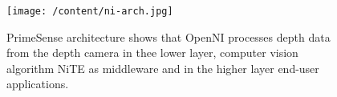 \begin{figure}
	[h] \centering 
	\texttt{[image: /content/ni-arch.jpg]} \caption{ PrimeSense architecture shows that OpenNI processes depth data from the depth camera in thee lower layer, computer vision algorithm NiTE as middleware and in the higher layer end-user applications. \cite{12} } \label{fg:ni:arch} 
\end{figure}
